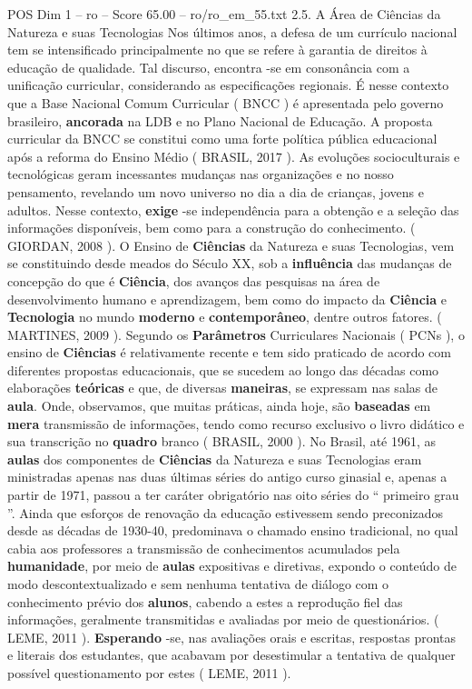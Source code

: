 \begin{textsample}{POS Dim 1 – ro – Score 65.00 – ro/ro\_em\_55.txt}  \label{ex:f1_pos_132}
2.5.
A Área de Ciências da Natureza e suas Tecnologias Nos últimos anos, a defesa de um currículo nacional tem se intensificado principalmente no que se refere à garantia de direitos à educação de qualidade.
Tal discurso, encontra -se em consonância com a unificação curricular, considerando as especificações regionais.
É nesse contexto que a Base Nacional Comum Curricular ( BNCC ) é apresentada pelo governo brasileiro, \textbf{ancorada} na LDB e no Plano Nacional de Educação.
A proposta curricular da BNCC se constitui como uma forte política pública educacional após a reforma do Ensino Médio ( BRASIL, 2017 ).
As evoluções socioculturais e tecnológicas geram incessantes mudanças nas organizações e no nosso pensamento, revelando um novo universo no dia a dia de crianças, jovens e adultos.
Nesse contexto, \textbf{exige} -se independência para a obtenção e a seleção das informações disponíveis, bem como para a construção do conhecimento. ( GIORDAN, 2008 ).
O Ensino de \textbf{Ciências} da Natureza e suas Tecnologias, vem se constituindo desde meados do Século XX, sob a \textbf{influência} das mudanças de concepção do que é \textbf{Ciência}, dos avanços das pesquisas na área de desenvolvimento humano e aprendizagem, bem como do impacto da \textbf{Ciência} e \textbf{Tecnologia} no mundo \textbf{moderno} e \textbf{contemporâneo}, dentre outros fatores. ( MARTINES, 2009 ).
Segundo os \textbf{Parâmetros} Curriculares Nacionais ( PCNs ), o ensino de \textbf{Ciências} é relativamente recente e tem sido praticado de acordo com diferentes propostas educacionais, que se sucedem ao longo das décadas como elaborações \textbf{teóricas} e que, de diversas \textbf{maneiras}, se expressam nas salas de \textbf{aula}.
Onde, observamos, que muitas práticas, ainda hoje, são \textbf{baseadas} em \textbf{mera} transmissão de informações, tendo como recurso exclusivo o livro didático e sua transcrição no \textbf{quadro} branco ( BRASIL, 2000 ).
No Brasil, até 1961, as \textbf{aulas} dos componentes de \textbf{Ciências} da Natureza e suas Tecnologias eram ministradas apenas nas duas últimas séries do antigo curso ginasial e, apenas a partir de 1971, passou a ter caráter obrigatório nas oito séries do “ primeiro grau ”.
Ainda que esforços de renovação da educação estivessem sendo preconizados desde as décadas de 1930-40, predominava o chamado ensino tradicional, no qual cabia aos professores a transmissão de conhecimentos acumulados pela \textbf{humanidade}, por meio de \textbf{aulas} expositivas e diretivas, expondo o conteúdo de modo descontextualizado e sem nenhuma tentativa de diálogo com o conhecimento prévio dos \textbf{alunos}, cabendo a estes a reprodução fiel das informações, geralmente transmitidas e avaliadas por meio de questionários. ( LEME, 2011 ). \textbf{Esperando} -se, nas avaliações orais e escritas, respostas prontas e literais dos estudantes, que acabavam por desestimular a tentativa de qualquer possível questionamento por estes ( LEME, 2011 ).

\end{textsample}
